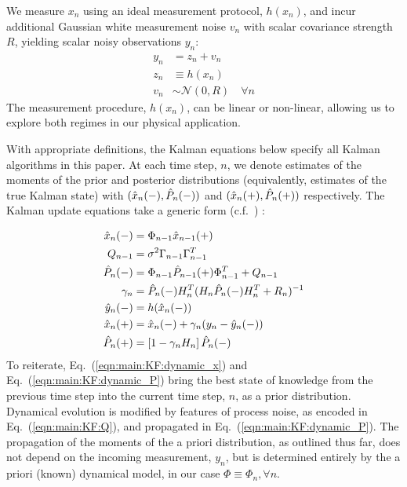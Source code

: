 We measure $x_n$ using an ideal measurement protocol, $h(x_n)$, and incur additional Gaussian white measurement noise $v_n$ with scalar covariance strength $R$, yielding scalar noisy observations $y_n$:
\begin{align}
	y_n &= z_n + v_n \\
	z_n & \equiv  h(x_n) \\
	v_n & \sim \mathcal{N}(0, R) \quad \forall n
\end{align}
The measurement procedure, $h(x_n)$, can be linear or non-linear, allowing us to explore both regimes in our physical application.

With appropriate definitions, the Kalman equations below specify all Kalman algorithms in this paper. At each time step, $n$, we denote estimates of the moments of the prior and posterior distributions (equivalently, estimates of the true Kalman state) with $(\hat{x}_{n}(-), \hat{P}_{n}(-))$ and $(\hat{x}_{n}(+), \hat{P}_{n}(+))$ respectively. The Kalman update equations take a generic form (c.f.~\cite{grewal2001theory}) :

\begin{align}
	\hat{x}_{n}(-) & = \Phi_{n-1} \hat{x}_{n-1}(+) \label{eqn:main:KF:dynamic_x}\\ 
	Q_{n-1} & = \sigma^2 \Gamma_{n-1}\Gamma_{n-1}^T  \label{eqn:main:KF:Q}\\
	\hat{P}_{n}(-)&= \Phi_{n-1} \hat{P}_{n-1}(+) \Phi_{n-1}^T + Q_{n-1} \label{eqn:main:KF:dynamic_P}\\
	\gamma_n &= \hat{P}_{n}(-) H_n^T(H_n\hat{P}_{n}(-)H_n^T + R_n)^{-1} \label{eqn:main:KF:gain}\\
	\hat{y}_n(-) & = h(\hat{x}_{n}(-)) \label{eqn:main:KF:step_ahead}\\
	\hat{x}_{n}(+) &= \hat{x}_{n}(-) + \gamma_n (y_n - \hat{y}_n(-)) \label{eqn:main:KF:bayesian_x}\\
	\hat{P}_{n}(+) &= \left[1  - \gamma_n H_n \right] \hat{P}_{n}(-) \label{eqn:main:KF:bayesian_p}
\end{align}
To reiterate, Eq.~(\ref {eqn:main:KF:dynamic_x}) and Eq.~(\ref {eqn:main:KF:dynamic_P}) bring the best state of knowledge from the previous time step into the current time step, $n$, as a prior distribution. Dynamical evolution is modified by features of process noise, as encoded in Eq.~(\ref {eqn:main:KF:Q}), and propagated in Eq.~(\ref {eqn:main:KF:dynamic_P}). The propagation of the moments of the a priori distribution, as outlined thus far, does not depend on the incoming measurement, $y_n$, but is determined entirely by the a priori (known) dynamical model, in our case $\Phi \equiv \Phi_n, \forall n$. 

